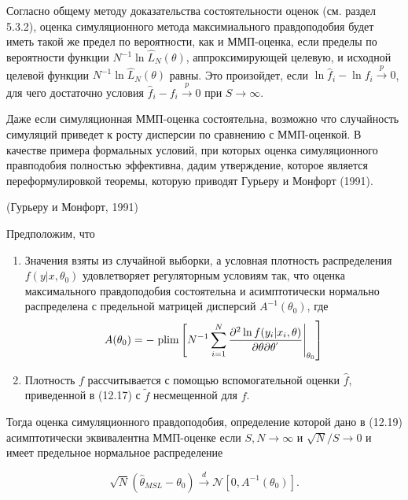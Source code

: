 Согласно общему методу доказательства состоятельности оценок (см. раздел 5.3.2), оценка симуляционного метода максимиального правдоподобия будет иметь такой же предел по вероятности, как и ММП-оценка, если пределы по вероятности функции $N^{-1}\ln{\hat{L}_N(\theta)}$, аппроксимирующей целевую, и исходной целевой функции $N^{-1}\ln{\hat{L}_N}(\theta)$ равны. Это произойдет, если $\ln{\hat{f}_i}-\ln{f_i} \stackrel{p}{\rightarrow} 0$, для чего достаточно условия $\hat{f}_i-f_i \stackrel{p}{\rightarrow} 0$ при $S \rightarrow \infty$.

Даже если симуляционная ММП-оценка состоятельна, возможно что случайность симуляций  приведет к росту дисперсии по сравнению с ММП-оценкой. В качестве примера формальных условий, при которых оценка симуляционного правподобия полностью эффективна, дадим утверждение, которое является переформулировкой теоремы, которую приводят Гурьеру и Монфорт (1991).

\begin{proposition}
(Гурьеру и Монфорт, 1991)

Предположим, что
\begin{enumerate}
\item Значения взяты из случайной выборки, а условная плотность распределения $f(y|x,\theta_0)$ удовлетворяет регуляторным условиям так, что оценка максимального правдоподобия состоятельна и асимптотически нормально распределена с предельной матрицей дисперсий $A^{-1}(\theta_0)$, где
\[
A(\theta_0)=-\left. \mathrm{plim }\left[ N^{-1}\sum^{N}_{i=1}\dfrac{{\partial}^{2}\ln f(y_i|x_i,\theta)}{\partial\theta\partial\theta^{'}} \right|_{ \theta_{0}}\right] 
\]

\item Плотность $f$ рассчитывается с помощью вспомогательной оценки $\hat{f}$, приведенной в (12.17) с $\tilde{f}$ несмещенной для $f$.
\end{enumerate}

Тогда оценка симуляционного правдоподобия, определение которой дано в (12.19) асимптотически эквивалентна ММП-оценке если $S,N \rightarrow \infty$ и $\sqrt{N}/S \rightarrow 0$ и имеет предельное нормальное распределение 


\begin{equation}
\sqrt{N}(\hat{\theta}_{MSL}-\theta_0)\stackrel{d}{\rightarrow} \mathcal{N}[0,A^{-1}(\theta_0)].
\end{equation}
\end{proposition}

